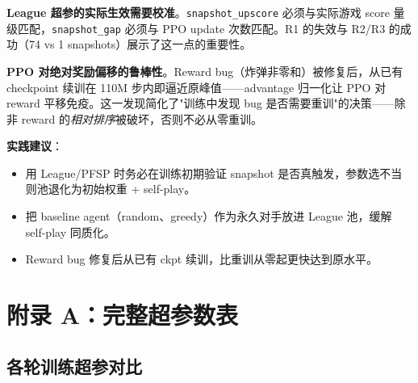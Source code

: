\documentclass[twocolumn,a4paper,10pt]{ctexart}
\begin{document}
\textbf{League 超参的实际生效需要校准}。\texttt{snapshot\_upscore} 必须与实际游戏 score 量级匹配，\texttt{snapshot\_gap} 必须与 PPO update 次数匹配。R1 的失效与 R2/R3 的成功（74 vs 1 snapshots）展示了这一点的重要性。

\textbf{PPO 对绝对奖励偏移的鲁棒性}。Reward bug（炸弹非零和）被修复后，从已有 checkpoint 续训在 110M 步内即逼近原峰值——advantage 归一化让 PPO 对 reward 平移免疫。这一发现简化了"训练中发现 bug 是否需要重训"的决策——除非 reward 的\emph{相对排序}被破坏，否则不必从零重训。

\textbf{实践建议}：
\begin{itemize}[nosep,leftmargin=1.2em]
\item 用 League/PFSP 时务必在训练初期验证 snapshot 是否真触发，参数选不当则池退化为初始权重 + self-play。
\item 把 baseline agent（random、greedy）作为永久对手放进 League 池，缓解 self-play 同质化。
\item Reward bug 修复后从已有 ckpt 续训，比重训从零起更快达到原水平。
\end{itemize}

\onecolumn
\appendix

\section*{附录 A：完整超参数表}

\subsection*{各轮训练超参对比}
\end{document}
